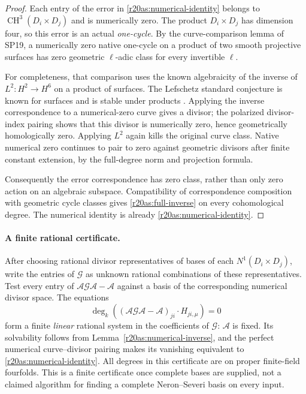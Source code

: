 \begin{proof}
Each entry of the error in \eqref{r20as:numerical-identity} belongs
to $\operatorname{CH}^3(D_i\times D_j)$ and is numerically zero.
The product $D_i\times D_j$ has dimension four, so this error is
an actual \emph{one-cycle}.  By the curve-comparison lemma of SP19,
a numerically zero native one-cycle on a product of two smooth
projective surfaces has zero geometric $\ell$-adic class for every
invertible $\ell$.

For completeness, that comparison uses the known algebraicity of
the inverse of $L^2:H^2\to H^6$ on a product of surfaces.  The
Lefschetz standard conjecture is known for surfaces and is stable
under products \cite[Proposition~4.3]{AS20Kleiman}.  Applying the
inverse correspondence to a numerical-zero curve gives a divisor;
the polarized divisor-index pairing shows that this divisor is
numerically zero, hence geometrically homologically zero.  Applying
$L^2$ again kills the original curve class.  Native numerical zero
continues to pair to zero against geometric divisors after finite
constant extension, by the full-degree norm and projection formula.

Consequently the error correspondence has zero class, rather than
only zero action on an algebraic subspace.  Compatibility of
correspondence composition with geometric cycle classes gives
\eqref{r20as:full-inverse} on every cohomological degree.
The numerical identity is already \eqref{r20as:numerical-identity}.
\end{proof}

\paragraph{A finite rational certificate.}
After choosing rational divisor representatives of bases of each
$N^1(D_i\times D_j)$, write the entries of $\mathcal G$ as unknown
rational combinations of these representatives.  Test every entry
of $\mathcal A\mathcal G\mathcal A-\mathcal A$ against a basis of
the corresponding numerical divisor space.  The equations
\[
 \deg_k\left(
   (\mathcal A\mathcal G\mathcal A-\mathcal A)_{ji}
                  \cdot H_{ji,\mu}\right)=0
 \tag{AS20.6}
\]
form a finite \emph{linear} rational system in the coefficients of
$\mathcal G$: $\mathcal A$ is fixed.  Its solvability follows from
Lemma~\ref{r20as:numerical-inverse}, and the perfect numerical
curve--divisor pairing makes its vanishing equivalent to
\eqref{r20as:numerical-identity}.  All degrees in this certificate
are on proper finite-field fourfolds.  This is a finite certificate
once complete bases are supplied, not a claimed algorithm for
finding a complete Neron--Severi basis on every input.

